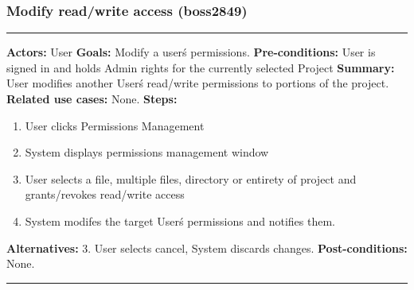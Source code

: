 \documentclass[11pt]{report}
\begin{document}
\subsubsection{Modify read/write access (boss2849)}
\vspace{2pt}
\hrule
\vspace{8pt}
 \textbf{Actors:} User \newline
\textbf{Goals:} Modify a user\'s permissions. \newline
 \textbf{Pre-conditions:} User is signed in and holds Admin rights for the currently selected Project\newline
 \textbf{Summary:} User modifies another User\'s read/write permissions to portions of the project. \newline
 \textbf{Related use cases:} None. \newline
\textbf{Steps:} \begin{enumerate}
  \item User clicks Permissions Management
  \item System displays permissions management window
  \item User selects a file, multiple files, directory or entirety of project and grants/revokes read/write access
  \item System modifes the target User\'s permissions and notifies them.
 \end{enumerate}
 \textbf{Alternatives:} 3. User selects cancel, System discards changes. \newline
 \textbf{Post-conditions:} None. \newline
\vspace{8pt}
\hrule
\newpage
\end{document}
